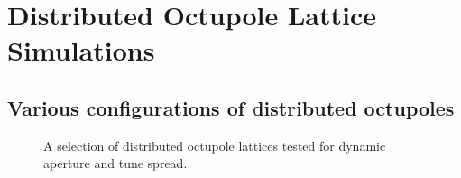 \section{Distributed Octupole Lattice Simulations}

\subsection{Various configurations of distributed octupoles}



\begin{figure}
\caption{A selection of distributed octupole lattices tested for dynamic aperture and tune spread. }
\label{fig:Noctulattices}
\end{figure}

